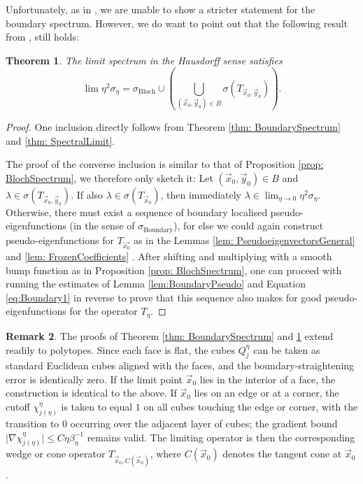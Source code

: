 \documentclass[a4paper,reqno]{amsart}
\numberwithin{equation}{section}
\numberwithin{equation}{section}		%
\numberwithin{figure}{section}			%
\numberwithin{table}{section}				%
\newtheorem{theorem}{Theorem}[section]
\theoremstyle{definition}
\newtheorem{remark}[theorem]{Remark}
\newcommand{\<}{\ensuremath \leq}
\renewcommand{\>}{\ensuremath \geq}
\begin{document}
Unfortunately, as in \cite{allaire1998bloch}, we are unable to show a stricter statement for the boundary spectrum. However, we do want to point out that the following result from \cite{allaire1998bloch}, still holds:
\begin{theorem}\label{thm: SpectralLimit2}
    The limit spectrum in the Hausdorff sense satisfies
    \begin{equation}        \lim\eta^{2}\sigma_\eta= \sigma_{\text{Bloch}}\cup\left(\bigcup_{(\vec{x}_0,\vec{y}_0)\in B}\sigma(T_{\vec{x}_0,\vec{y}_0})\right).
    \end{equation}
\end{theorem}
\begin{proof}
    One inclusion directly follows from Theorem \ref{thm: BoundarySpectrum} and \ref{thm: SpectralLimit}. 
    
    The proof of the converse inclusion is similar to that of Proposition \ref{prop: BlochSpectrum}, we therefore only sketch it: Let $(\vec{x}_0,\vec{y}_0)\in B$ and $\lambda \in \sigma(T_{\vec{x}_0,\vec{y}_0})$. If also $\lambda \in \sigma(T_{\vec{x}_0})$, then immediately $\lambda \in \lim_{\eta\rightarrow0}\eta^2\sigma_\eta$. Otherwise, there must exist a sequence of boundary localised pseudo-eigenfunctions (in the sense of $\sigma_{\text{Boundary}}$), for else we could again construct pseudo-eigenfunctions for $T_{\vec{x_0}}$ as in the Lemmas \ref{lem: PseudoeigenvectorsGeneral} and \ref{lem: FrozenCoefficients} . After shifting and multiplying with a smooth bump function as in Proposition \ref{prop: BlochSpectrum}, one can proceed with running the estimates of Lemma \ref{lem:BoundaryPseudo} and Equation \eqref{eq:Boundary1} in reverse to prove that this sequence also makes for good pseudo-eigenfunctions for the operator $T_\eta$.
\end{proof}
    






\begin{remark}
    The proofs of Theorem \ref{thm: BoundarySpectrum} and \ref{thm: SpectralLimit2} extend readily to polytopes. Since each face is flat, the cubes $Q_j^\eta$ can be taken as standard Euclidean cubes aligned with the faces, and the boundary-straightening error is identically zero. If the limit point $\vec{x}_0$ lies in the interior of a face, the construction is identical to the above. If $\vec{x}_0$ lies on an edge or at a corner, the cutoff $\chi_{j(\eta)}^\eta$ is taken to equal $1$ on all cubes touching the edge or corner, with the transition to $0$ occurring over the adjacent layer of cubes; the gradient bound $\lvert\nabla\chi_{j(\eta)}^\eta\rvert \leq C\eta\beta_\eta^{-1}$ remains valid. The limiting operator is then the corresponding wedge or cone operator $T_{\vec{x}_0, C(\vec{x}_0)}$, where $C(\vec{x}_0)$ denotes the tangent cone at $\vec{x}_0$.
\end{remark}
\end{document}
